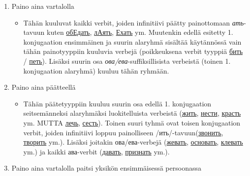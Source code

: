 \documentclass[]{scrreprt}
\providecommand{\tightlist}{%
  \setlength{\itemsep}{0pt}\setlength{\parskip}{0pt}}
\begin{document}
\begin{enumerate}
\def\labelenumi{\arabic{enumi}.}
\tightlist
\item
  Paino aina vartalolla

  \begin{itemize}
  \tightlist
  \item
    Tähän kuuluvat kaikki verbit, joiden infinitiivi päätty painottomaan
    \emph{ать}-tavuun kuten
    \href{http://ru.wiktionary.org/wiki/\%D0\%BE\%D0\%B1Едать}{обЕдать},
    \href{http://ru.wiktionary.org/wiki/\%D0\%BBАять}{лАять},
    \href{http://ru.wiktionary.org/wiki/Ехать}{Ехать} ym. Muutenkin
    edellä esitetty 1. konjugaation ensimmäinen ja suurin alaryhmä
    sisältää käytännössä vain tähän painotyyppiin kuuluvia verbejä
    (poikkeuksena verbit tyyppiä
    \href{http://ru.wiktionary.org/wiki/\%D0\%B1\%D0\%B8\%D1\%82\%D1\%8C}{бить}
    /
    \href{http://ru.wiktionary.org/wiki/\%D0\%BF\%D0\%B5\%D1\%82\%D1\%8C}{петь}).
    Lisäksi suurin osa \emph{ова/ева}-suffiksillisista verbeistä (toinen
    1. konjugaation alaryhmä) kuuluu tähän ryhmään.
  \end{itemize}
\item
  Paino aina päätteellä

  \begin{itemize}
  \tightlist
  \item
    Tähän päätetyyppiin kuuluu suurin osa edellä 1. konjugaation
    seitsemänneksi alaryhmäksi luokitelluista verbeistä
    (\href{http://ru.wiktionary.org/wiki/\%D0\%B6\%D0\%B8\%D1\%82\%D1\%8C}{жить},
    \href{http://ru.wiktionary.org/wiki/\%D0\%BD\%D0\%B5\%D1\%81\%D1\%82\%D0\%B8}{нести},
    \href{http://ru.wiktionary.org/wiki/\%D0\%BA\%D1\%80\%D0\%B0\%D1\%81\%D1\%82\%D1\%8C}{красть}
    ym. MUTTA
    \href{http://ru.wiktionary.org/wiki/\%D0\%BB\%D0\%B5\%D1\%87\%D1\%8C}{лечь},
    \href{http://ru.wiktionary.org/wiki/\%D1\%81\%D0\%B5\%D1\%81\%D1\%82\%D1\%8C}{сесть}).
    Toinen suuri tyhmä ovat toisen konjugaation verbit, joiden
    infinitiivi loppuu painolliseen
    /ить/-tavuun(\href{http://ru.wiktionary.org/wiki/\%D0\%B7\%D0\%B2\%D0\%BE\%D0\%BD\%D0\%B8\%D1\%82\%D1\%8C}{звонить},
    \href{http://ru.wiktionary.org/wiki/\%D1\%82\%D0\%B2\%D0\%BE\%D1\%80\%D0\%B8\%D1\%82\%D1\%8C}{творить}
    ym.). Lisäksi joitakin ова/ева-verbejä
    (\href{http://ru.wiktionary.org/wiki/\%D0\%B6\%D0\%B5\%D0\%B2\%D0\%B0\%D1\%82\%D1\%8C}{жевать},
    \href{http://ru.wiktionary.org/wiki/\%D0\%BE\%D1\%81\%D0\%BD\%D0\%BE\%D0\%B2\%D0\%B0\%D1\%82\%D1\%8C}{основать},
    \href{http://ru.wiktionary.org/wiki/\%D0\%BA\%D0\%BB\%D0\%B5\%D0\%B2\%D0\%B0\%D1\%82\%D1\%8C}{клевать}
    ym.) ja kaikki ава-verbit
    (\href{http://ru.wiktionary.org/wiki/\%D0\%B4\%D0\%B0\%D0\%B2\%D0\%B0\%D1\%82\%D1\%8C}{давать},
    \href{http://ru.wiktionary.org/wiki/\%D0\%BF\%D1\%80\%D0\%B8\%D0\%B7\%D0\%BD\%D0\%B0\%D1\%82\%D1\%8C}{признать}
    ym.).
  \end{itemize}
\item
  Paino aina vartalolla paitsi yksikön ensimmäisessä persoonassa


\end{enumerate}
\end{document}
